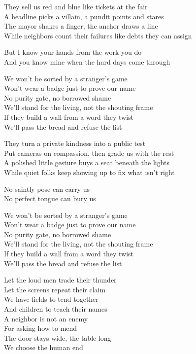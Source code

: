 \begin{lyrics}
They sell us red and blue like tickets at the fair\\
A headline picks a villain, a pundit points and stares\\
The mayor shakes a finger, the anchor draws a line\\
While neighbors count their failures like debts they can assign

But I know your hands from the work you do\\
And you know mine when the hard days come through

We won't be sorted by a stranger's game\\
Won't wear a badge just to prove our name\\
No purity gate, no borrowed shame\\
We'll stand for the living, not the shouting frame\\
If they build a wall from a word they twist\\
We'll pass the bread and refuse the list

They turn a private kindness into a public test\\
Put cameras on compassion, then grade us with the rest\\
A polished little gesture buys a seat beneath the lights\\
While quiet folks keep showing up to fix what isn't right

No saintly pose can carry us\\
No perfect tongue can bury us

We won't be sorted by a stranger's game\\
Won't wear a badge just to prove our name\\
No purity gate, no borrowed shame\\
We'll stand for the living, not the shouting frame\\
If they build a wall from a word they twist\\
We'll pass the bread and refuse the list

Let the loud men trade their thunder\\
Let the screens repeat their claim\\
We have fields to tend together\\
And children to teach their names\\
A neighbor is not an enemy\\
For asking how to mend\\
The door stays wide, the table long\\
We choose the human end


\end{lyrics}
